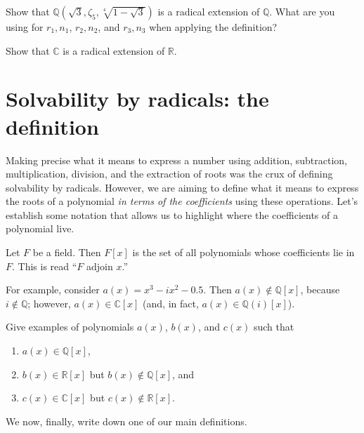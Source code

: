 \begin{problem}
Show that  $\mathbb{Q}\left(\sqrt{3},\zeta_5,\sqrt[4]{1 - \sqrt{3}}\right)$ is a radical extension of $\mathbb{Q}$. What are you using for $r_1,n_1$, $r_2, n_2$, and $r_3, n_3$ when applying the definition?
\end{problem}

\begin{problem}
Show that $\mathbb{C}$ is a radical extension of $\mathbb{R}$.
\end{problem}

\section{Solvability by radicals: the definition}
Making precise what it means to express a number using addition, subtraction, multiplication, division, and the extraction of roots was the crux of defining solvability by radicals. However, we are aiming to define what it means to express the roots of a polynomial \emph{in terms of the coefficients} using these operations. Let's establish some notation that allows us to highlight where the coefficients of a polynomial live.

\begin{definition}
Let $F$ be a field. Then $F[x]$ is the set of all polynomials whose coefficients lie in $F$. This is read ``$F$ adjoin $x$.''%
\end{definition}

For example, consider $a(x) = x^3 -ix^2 -0.5$. Then  $a(x) \notin \mathbb{Q}[x]$, because $i\notin \mathbb{Q}$; however, $a(x)\in\mathbb{C}[x]$ (and, in fact, $a(x)\in\mathbb{Q}\left(i\right)[x]$).
\begin{problem}
Give examples of polynomials $a(x)$, $b(x)$, and $c(x)$ such that 
\begin{enumerate}
\item $a(x) \in \mathbb{Q}[x]$, 
\item $b(x) \in \mathbb{R}[x]$ but $b(x) \notin \mathbb{Q}[x]$, and 
\item $c(x) \in \mathbb{C}[x]$ but $c(x) \notin \mathbb{R}[x]$.
\end{enumerate}
\end{problem}
We now, finally, write down one of our  main definitions.

